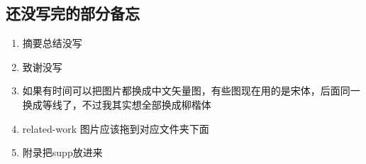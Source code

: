 %
%
%
%
%
%

\begin{appendices}
  \section{还没写完的部分备忘}
  \begin{enumerate}
      \item 摘要总结没写
      \item 致谢没写
      \item 如果有时间可以把图片都换成中文矢量图，有些图现在用的是宋体，后面同一换成等线了，不过我其实想全部换成柳楷体
      \item related-work 图片应该拖到对应文件夹下面
      \item 附录把supp放进来
  \end{enumerate}

\end{appendices}

